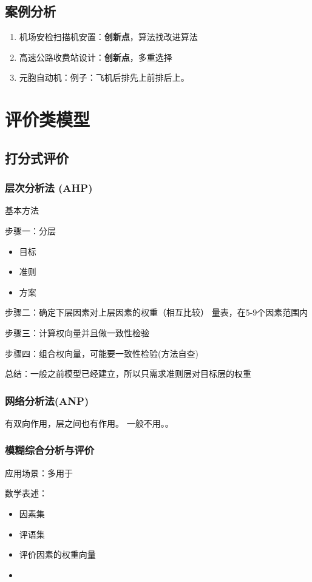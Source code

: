 \documentclass[12pt,a4paper]{article}
\begin{document}
\subsection{案例分析}
\begin{enumerate}
  \item 机场安检扫描机安置：\textbf{创新点}，算法找改进算法
  \item 高速公路收费站设计：\textbf{创新点}，多重选择
  \item 元胞自动机：例子：飞机后排先上前排后上。
\end{enumerate}

\section{评价类模型}
\subsection{打分式评价}
\subsubsection{层次分析法 (AHP)}
基本方法

步骤一：分层
\begin{itemize}
  \item 目标
  \item 准则
  \item 方案
\end{itemize}
步骤二：确定下层因素对上层因素的权重（相互比较）
量表，在5-9个因素范围内

步骤三：计算权向量并且做一致性检验

步骤四：组合权向量，可能要一致性检验(方法自查)

总结：一般之前模型已经建立，所以只需求准则层对目标层的权重

\subsubsection{网络分析法(ANP)}
有双向作用，层之间也有作用。
一般不用。。

\subsubsection{模糊综合分析与评价}
应用场景：多用于

数学表述：
\begin{itemize}
  \item 因素集
  \item 评语集
  \item 评价因素的权重向量
  \item
\end{itemize}
\end{document}
